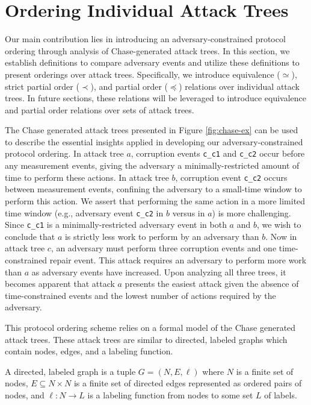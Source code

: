 \documentclass[runningheads]{llncs}
\theoremstyle{definition}
\begin{document}
\section{Ordering Individual Attack Trees}

Our main contribution lies in introducing an adversary-constrained protocol ordering through analysis of Chase-generated attack trees. In this section, we establish definitions to compare adversary events and utilize these definitions to present orderings over attack trees. Specifically, we introduce equivalence ($\simeq$), strict partial order ($\prec$), and partial order ($\preceq$) relations over individual attack trees. In future sections, these relations will be leveraged to introduce equivalence and partial order relations over sets of attack trees.

The Chase generated attack trees presented in Figure \ref{fig:chase-ex} can be used to describe the essential insights applied in developing our adversary-constrained protocol ordering. In attack tree $a$, corruption events \texttt{c\_c1} and \texttt{c\_c2} occur before any measurement events, giving the adversary a minimally-restricted amount of time to perform these actions. In attack tree $b$, corruption event \texttt{c\_c2} occurs between measurement events, confining the adversary to a small-time window to perform this action. We assert that performing the same action in a more limited time window (e.g., adversary event \texttt{c\_c2} in $b$ versus in $a$) is more challenging. Since \texttt{c\_c1} is a minimally-restricted adversary event in both $a$ and $b$, we wish to conclude that $a$ is strictly less work to perform by an adversary than $b$. Now in attack tree $c$, an adversary must perform three corruption events and one time-constrained repair event. This attack requires an adversary to perform more work than $a$ as adversary events have increased. Upon analyzing all three trees, it becomes apparent that attack $a$ presents the easiest attack given the absence of time-constrained events and the lowest number of actions required by the adversary. 



This protocol ordering scheme relies on a formal model of the Chase generated attack trees. These attack trees are similar to directed, labeled graphs which contain nodes, edges, and a labeling function. 

\begin{definition}[Graph]
    A directed, labeled graph is a tuple $G = (N, E, \ell)$ where $N$ is a finite set of nodes, $E \subseteq N \times N$ is a finite set of directed edges represented as ordered pairs of nodes, and $\ell : N \rightarrow L$ is a labeling function from nodes to some set $L$ of labels. 
\end{definition}
 
\end{document}
